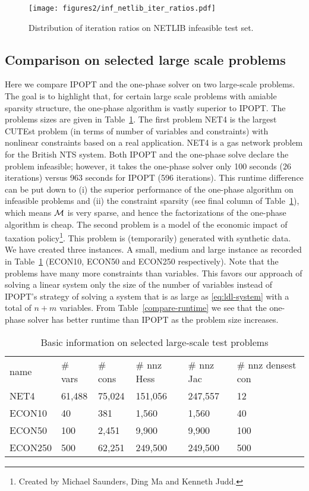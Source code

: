 \documentclass{article}
\begin{document}
\begin{figure}[H]
\texttt{[image: figures2/inf\_netlib\_iter\_ratios.pdf]}
\caption{Distribution of iteration ratios on NETLIB infeasible test set.}\label{fig:inf_netlib_iter_ratios}
\end{figure}

\subsection{Comparison on selected large scale problems}\label{sec:large-scale}
\newcommand{\NETtimeOnePhase}{100}
\newcommand{\NETtimeIPOPT}{963}
\newcommand{\NETitOnePhase}{26}
\newcommand{\NETitIPOPT}{596}

Here we compare IPOPT and the one-phase solver on two large-scale problems. The goal is to highlight that, for certain large scale problems with amiable sparsity structure, the one-phase algorithm is vastly superior to IPOPT. The problems sizes are given in Table~\ref{large-scale:basic-info}. The first problem NET4 is the largest CUTEst problem (in terms of number of variables and constraints) with nonlinear constraints based on a real application. NET4 is a gas network problem for the British NTS system. Both IPOPT and the one-phase solve declare the problem infeasible; however, it takes the one-phase solver only 100 seconds ($26$ iterations) versus 963 seconds for IPOPT (596 iterations). This runtime difference can be put down to (i) the superior performance of the one-phase algorithm on infeasible problems and (ii) the constraint sparsity (see final column of Table~\ref{large-scale:basic-info}), which means $\mathcal{M}$ is very sparse, and hence the factorizations of the one-phase algorithm is cheap. The second problem is a model of the economic impact of taxation policy\footnote{Created by Michael Saunders, Ding Ma and Kenneth Judd.}. This problem is (temporarily) generated with synthetic data. We have created three instances. A small, medium and large instance as recorded in Table~\ref{large-scale:basic-info} (ECON10, ECON50 and ECON250 respectively). Note that the problems have many more constraints than variables. This favors our approach of solving a linear system only the size of the number of variables instead of IPOPT's strategy of solving a system that is as large as \eqref{eq:ldl-system} with a total of $n + m$ variables. From Table~\ref{compare-runtime} we see that the one-phase solver has better runtime than IPOPT as the problem size increases.
\begin{table}[H]
\begin{tabular}{l l l l l l}
name &  \# vars & \# cons & \# nnz Hess & \# nnz Jac & \# nnz densest con  \\ 
NET4 & 61,488 & 75,024  & 151,056 & 247,557 & 12 \\  
ECON10 &  40 & 381 & 1,560 & 1,560 &  40 \\
ECON50 &  100 & 2,451 & 9,900 & 9,900 &  100 \\
ECON250 & 500 & 62,251 & 249,500 & 249,500 & 500 \\
\end{tabular}
\caption{Basic information on selected large-scale test problems}\label{large-scale:basic-info}
\end{table}
\end{document}
